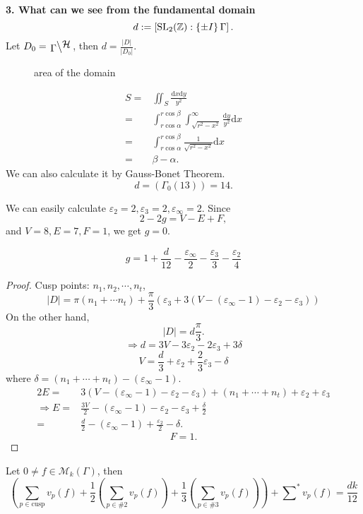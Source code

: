 \noindent\textbf{3. What can we see from the fundamental domain}\\
\[
d:=\left[ \operatorname{SL}_2(\mathbb{Z}): \left\{\pm I\right\} \Gamma \right] .
\] 
Let $D_0=\bsfrac{\Gamma}{\mathcal{H}}$, then $d= \frac{|D|}{|D_0|}$.
\begin{figure}[ht]
    \centering
    \caption{area of the domain}
    \label{fig:area-of-the-domain}
\end{figure}
\begin{align*}
  S=&\iint_S \frac{\mathrm{d}x\mathrm{d}y}{y^2}\\
  =&\int_{r\cos\alpha}^{r\cos\beta}\int ^{\infty}_{\sqrt{r^2-x^2} } \frac{\mathrm{d}y}{y^2}\mathrm{d}x\\
  =& \int_{r\cos\alpha}^{r\cos\beta}\frac{1}{\sqrt{r^2-x^2} }\mathrm{d}x\\
  =&\beta-\alpha
.\end{align*}
We can also calculate it by Gauss-Bonet Theorem.
\[
  d=\left( \Gamma_0(13) \right) =14.
\] 

We can easily calculate $\varepsilon _2=2,\varepsilon _3=2,\varepsilon _\infty=2$. Since
\[
2-2g=V-E+F,
\] 
and $V=8,E=7,F=1$, we get  $g=0$.
\begin{proposition}
  \[
  g=1+\frac{d}{12}-\frac{\varepsilon _\infty}{2}-\frac{\varepsilon _3}{3}-\frac{\varepsilon _{2}}{4}
  \]
\end{proposition}
\begin{proof}
Cusp points: $n_1,n_2,\cdots,n_t$,
\[
  |D|=\pi\left( n_1+\cdots n_t \right) +\frac{\pi}{3}\left( \varepsilon _3+3\left( V-(\varepsilon _\infty-1)  -\varepsilon _2-\varepsilon _3\right) \right) 
\] 
On the other hand,
\[
|D|=d \frac{\pi}{3}.
\] 
\[
\Rightarrow d=3V-3\varepsilon _2-2\varepsilon _3+3\delta
\] 
\[
V=\frac{d}{3}+\varepsilon _2+\frac{2}{3}\varepsilon _3-\delta
\] 
where $\delta=(n_1+\cdots+n_t)-(\varepsilon _\infty-1)$.
\begin{align*}
  2E=&3\left( V-(\varepsilon _\infty-1)-\varepsilon _2-\varepsilon _3 \right) +(n_1+\cdots+n_t)+\varepsilon _2+\varepsilon _3\\
  \Rightarrow E=&\frac{3V}{2}-\left( \varepsilon _\infty-1 \right) -\varepsilon _2-\varepsilon _3+\frac{\delta}{2}\\
  =&\frac{d}{2}-(\varepsilon _\infty-1)+\frac{\varepsilon _2}{2}-\delta
.\end{align*}
\[
F=1.
\] 
\end{proof}
\begin{proposition}
  Let $0\neq f \in \mathcal{M}_k(\Gamma)$, then
  \[
    \left( \sum_{p \in  \text{cusp} }^{} v_p(f)+\frac{1}{2}\left( \sum_{p \in \# 2}^{} v_p(f) \right) +\frac{1}{3}\left( \sum_{p \in \# 3}^{} v_p(f) \right)  \right) +\sum\nolimits^{*}v_p(f)=\frac{dk}{12}
  \] 
\end{proposition}
